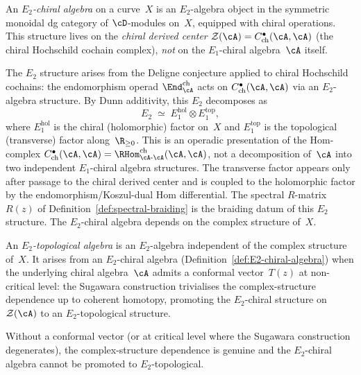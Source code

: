 \begin{definition}
\label{def:E2-chiral-algebra}
An \emph{$E_2$-chiral algebra} on a curve~$X$ is an $E_2$-algebra
object in the symmetric monoidal dg category of $\cD$-modules on~$X$,
equipped with chiral operations. This structure lives on the
\emph{chiral derived center}
$\mathcal{Z}(\cA) = C^\bullet_{\mathrm{ch}}(\cA,\cA)$
(the chiral Hochschild cochain complex), \emph{not} on the
$E_1$-chiral algebra~$\cA$ itself.

The $E_2$ structure arises from the Deligne conjecture applied to
chiral Hochschild cochains: the endomorphism operad
$\End^{\mathrm{ch}}_\cA$ acts on
$C^\bullet_{\mathrm{ch}}(\cA,\cA)$ via an $E_2$-algebra structure.
By Dunn additivity, this $E_2$ decomposes as
\[
E_2 \;\simeq\; E_1^{\mathrm{hol}} \otimes E_1^{\mathrm{top}},
\]
where $E_1^{\mathrm{hol}}$ is the chiral (holomorphic) factor on~$X$
and $E_1^{\mathrm{top}}$ is the topological (transverse) factor
along~$\R_{\ge 0}$. This is an operadic presentation of the
Hom-complex
$C^\bullet_{\mathrm{ch}}(\cA,\cA)
=\RHom^{\mathrm{ch}}_{\cA\text{-}\cA}(\cA,\cA)$, not a
decomposition of~$\cA$ into two independent $E_1$-chiral algebra
structures. The transverse factor appears only after passage to the
chiral derived center and is coupled to the holomorphic factor by the
endomorphism/Koszul-dual Hom differential. The spectral $R$-matrix $R(z)$ of
Definition~\textup{\ref{def:spectral-braiding}} is the braiding
datum of this $E_2$ structure. The $E_2$-chiral algebra depends on
the complex structure of~$X$.
\end{definition}

\begin{definition}
\label{def:E2-topological-algebra}
An \emph{$E_2$-topological algebra} is an $E_2$-algebra
independent of the complex structure of~$X$. It arises from an
$E_2$-chiral algebra
\textup{(}Definition~\textup{\ref{def:E2-chiral-algebra}}\textup{)}
when the underlying chiral algebra~$\cA$ admits a conformal
vector~$T(z)$ at non-critical level: the Sugawara construction
trivialises the complex-structure dependence up to coherent
homotopy, promoting the $E_2$-chiral structure on
$\mathcal{Z}(\cA)$ to an $E_2$-topological structure.

Without a conformal vector (or at critical level where the
Sugawara construction degenerates), the complex-structure
dependence is genuine and the $E_2$-chiral algebra cannot be
promoted to $E_2$-topological.
\end{definition}

